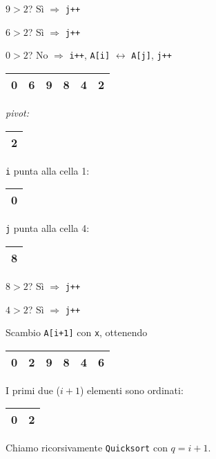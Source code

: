 $9 > 2$? Sì $\Rightarrow$ \texttt{j++} \par
$6 > 2$? Sì $\Rightarrow$ \texttt{j++} \par
$0 > 2$? No $\Rightarrow$ \texttt{i++}, \texttt{A[i]} $\leftrightarrow$ \texttt{A[j]}, \texttt{j++} \par

\begin{center}
	\begin{tabular}{|l|l|l|l|l|l|}
		\hline
		0 & 6 & 9 & 8 & 4 & 2 \\
		\hline
	\end{tabular}
	\hspace{1cm}
	\emph{pivot: }
	\begin{tabular}{|l|}
		\hline
		2 \\
		\hline
	\end{tabular}
\end{center}

\texttt{i} punta alla cella 1: 
\begin{tabular}{|l|}
	\hline
	0 \\
	\hline
\end{tabular} \par
\texttt{j} punta alla cella 4:
\begin{tabular}{|l|}
	\hline
	8 \\
	\hline
\end{tabular}

$8 > 2$? Sì $\Rightarrow$ \texttt{j++} \par
$4 > 2$? Sì $\Rightarrow$ \texttt{j++} \par
Scambio \texttt{A[i+1]} con \texttt{x}, ottenendo \par

\begin{center}
	\begin{tabular}{|l|l|l|l|l|l|}
		\hline
		0 & 2 & 9 & 8 & 4 & 6 \\
		\hline
	\end{tabular}
\end{center}

I primi due ($i+1$) elementi sono ordinati: 
\begin{center}
	\begin{tabular}{|l|l|}
		\hline
		0 & 2 \\
		\hline
	\end{tabular}
\end{center}

Chiamo ricorsivamente \texttt{Quicksort} con $q = i + 1$.

